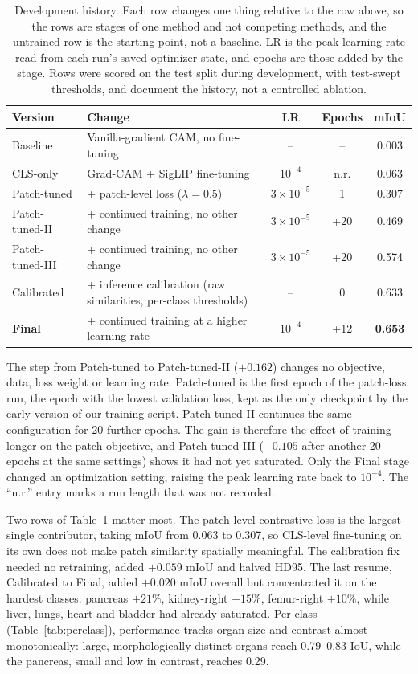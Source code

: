 \documentclass[10pt]{article}
\begin{document}
\begin{table}[!htbp]
\centering
\caption{Development history. Each row changes one thing relative to the row
above, so the rows are stages of one method and not competing methods, and the untrained row is the starting point, not a baseline. LR is the peak learning
rate read from each run's saved optimizer state, and epochs are those added by the
stage. Rows were scored on the test split during development, with test-swept
thresholds, and document the history, not a controlled ablation.}
\label{tab:progression}
\small
\begin{tabular}{llccc}
\toprule
Version & Change & LR & Epochs & mIoU \\
\midrule
Baseline        & Vanilla-gradient CAM, no fine-tuning & -- & -- & 0.003 \\
CLS-only        & Grad-CAM + SigLIP fine-tuning & $10^{-4}$ & n.r. & 0.063 \\
Patch-tuned     & \quad + patch-level loss ($\lambda=0.5$) & $3\times10^{-5}$ & 1 & 0.307 \\
Patch-tuned-II  & \quad + continued training, no other change & $3\times10^{-5}$ & +20 & 0.469 \\
Patch-tuned-III & \quad + continued training, no other change & $3\times10^{-5}$ & +20 & 0.574 \\
Calibrated      & \quad + inference calibration (raw similarities, per-class thresholds) & -- & 0 & 0.633 \\
\textbf{Final}  & \quad + continued training at a higher learning rate & $10^{-4}$ & +12 & \textbf{0.653} \\
\bottomrule
\end{tabular}
\end{table}

The step from Patch-tuned to Patch-tuned-II ($+0.162$) changes no objective,
data, loss weight or learning rate. Patch-tuned is the first epoch of the
patch-loss run, the epoch with the lowest validation loss, kept as the only checkpoint by the early version of our training script. Patch-tuned-II
continues the same configuration for 20 further epochs. The gain is therefore the
effect of training longer on the patch objective, and Patch-tuned-III ($+0.105$
after another 20 epochs at the same settings) shows it had not yet saturated. Only
the Final stage changed an optimization setting, raising the peak learning rate
back to $10^{-4}$. The ``n.r.'' entry marks a run length that was not recorded.

Two rows of Table~\ref{tab:progression} matter most. The patch-level contrastive
loss is the largest single contributor, taking mIoU from 0.063 to 0.307, so
CLS-level fine-tuning on its own does not make patch similarity spatially
meaningful. The calibration fix needed no retraining, added $+0.059$ mIoU and
halved HD95. The last resume, Calibrated to Final, added $+0.020$ mIoU overall
but concentrated it on the hardest classes: pancreas $+21\%$, kidney-right
$+15\%$, femur-right $+10\%$, while liver, lungs, heart and bladder had already
saturated. Per class (Table~\ref{tab:perclass}), performance tracks organ size and
contrast almost monotonically: large, morphologically distinct organs reach
0.79--0.83 IoU, while the pancreas, small and low in contrast, reaches 0.29.
\end{document}
